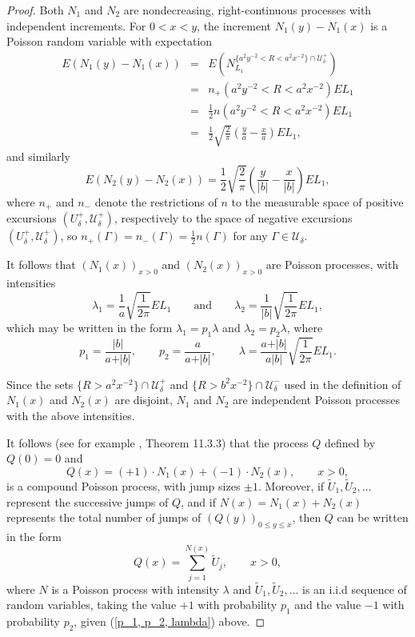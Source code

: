 \documentclass[reqno]{amsart}
\theoremstyle{definition}
\theoremstyle{remark}
\numberwithin{equation}{section}
\begin{document}
\begin{proof}
Both $N_1$ and $N_2$ are nondecreasing, right-continuous processes with independent increments. For $0<x<y$, the increment $N_1(y)-N_1(x)$ is a Poisson random variable with expectation
\begin{eqnarray*}
E(N_1(y)-N_1(x))&=&E\left (N_{L_1}^{\{a^2y^{-2}<R<a^2x^{-2}\}\cap \mathcal{U}_\delta^+}\right)\\
&=&n_+(a^2y^{-2}<R<a^2x^{-2}) E L_1\\
&=&\frac12 n(a^2y^{-2}<R<a^2x^{-2}) EL_1\\
&=&\frac12\sqrt{\frac{2}{\pi}} \left(\frac{y}{a}-\frac{x}{a}\right) EL_1,
\end{eqnarray*}
and similarly
\begin{equation}
E(N_2(y)-N_2(x))=\frac12\sqrt{\frac{2}{\pi}} \left(\frac{y}{\vert b\vert}-\frac{x}{\vert b\vert}\right) EL_1,
\end{equation}
where $n_+$ and $n_-$ denote the restrictions of $n$ to the measurable space of positive excursions $(U_\delta^+,\mathcal{U}_\delta^+)$, respectively to the space of negative excursions $(U_\delta^+,\mathcal{U}_\delta^+)$, so $n_+(\Gamma)=n_-(\Gamma)=\frac12 n(\Gamma)$ for any $\Gamma \in \mathcal{U}_\delta$.

It follows that $(N_1(x))_{x>0}$ and $(N_2(x))_{x>0}$ are Poisson processes, with intensities
\begin{equation}
\lambda_1=\frac{1}{a}\sqrt{\frac1{2\pi}} EL_1\qquad \text{and} \qquad \lambda_2=\frac{1}{\vert b\vert}\sqrt{\frac1{2\pi}} E L_1 ,
\end{equation}
which may be written in the form $\lambda_1=p_1\lambda$ and $\lambda_2=p_2 \lambda$, where
\begin{equation}\label{p_1, p_2, lambda}
p_1=\frac{\vert b\vert}{a+\vert b\vert},\qquad p_2=\frac{a}{a+\vert b \vert},\qquad \lambda=\frac{a+\vert b\vert}{a\vert b\vert}\sqrt{\frac1{2\pi}} E L_1.
\end{equation}

Since the sets $\{R>a^2x^{-2}\}\cap \mathcal{U}_\delta^+$ and $\{R>b^2x^{-2}\}\cap \mathcal{U}_\delta^-$ used in the definition of $N_1(x)$ and $N_2(x)$ are disjoint, $N_1$ and $N_2$ are independent Poisson processes with the above intensities.

It follows (see for example \cite{Shreve}, Theorem 11.3.3) that the process $Q$ defined by $Q(0)=0$ and
\begin{equation}
Q(x)=(+1)\cdot N_1(x)+(-1)\cdot N_2(x),\qquad x>0,
\end{equation}
is a compound Poisson process, with jump sizes $\pm1$. Moreover, if $\widetilde{U}_1,\widetilde{U}_2,\ldots$ represent the successive jumps of $Q$, and if $N(x)=N_1(x)+N_2(x)$ represents the total number of jumps of $(Q(y))_{0\leq y\leq x}$, then $Q$ can be written in the form
\begin{equation}\label{alternate representation of Q}
Q(x)=\sum_{j=1}^{N(x)} \widetilde{U}_j, \qquad x>0,
\end{equation}
where $N$ is a Poisson process with intensity $\lambda$ and $\widetilde{U}_1, \widetilde{U}_2,\ldots$ is an i.i.d sequence of random variables, taking the value $+1$ with probability $p_1$ and the value $-1$ with probability $p_2$, given (\ref{p_1, p_2, lambda}) above.


\end{proof}
\end{document}
